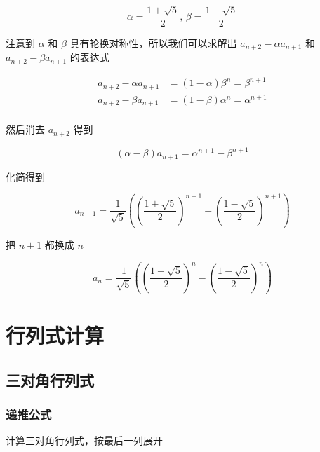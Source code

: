 \documentclass[12pt,a4paper]{ctexart}
\begin{document}
\[
\alpha = \frac{1+\sqrt{5}}{2},\, \beta = \frac{1-\sqrt{5}}{2}
\]

注意到 $\alpha$ 和 $\beta$ 具有轮换对称性，所以我们可以求解出 $a_{n+2} - \alpha a_{n+1}$ 和  $a_{n+2} - \beta a_{n+1}$ 的表达式

\begin{align*}
 a_{n+2} - \alpha a_{n+1} &= (1-\alpha) \beta^{n} = \beta^{n+1}  \\
 a_{n+2} - \beta a_{n+1} &= (1-\beta) \alpha^{n} = \alpha^{n+1}  \\
\end{align*}

然后消去 $a_{n+2}$ 得到

\[
(\alpha - \beta)a_{n+1} = \alpha^{n+1} -  \beta^{n+1}
\]

化简得到

\[
a_{n+1} = \frac{1}{\sqrt{5}}((\frac{1+\sqrt{5}}{2})^{n+1} - (\frac{1-\sqrt{5}}{2})^{n+1})
\]

把 $n+1$ 都换成 $n$

\[
a_{n} = \frac{1}{\sqrt{5}}((\frac{1+\sqrt{5}}{2})^{n} - (\frac{1-\sqrt{5}}{2})^{n})
\]

\section{行列式计算}

\subsection{三对角行列式}

\subsubsection{递推公式}

计算三对角行列式，按最后一列展开
\end{document}
